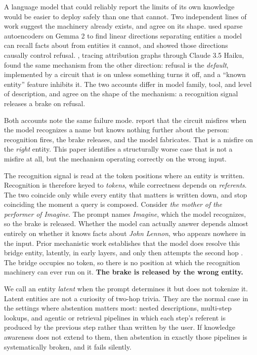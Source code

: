 \documentclass{article}
\begin{document}
A language model that could reliably report the limits of its own knowledge would be easier to deploy safely than one that cannot. Two independent lines of work suggest the machinery
already exists, and agree on its shape. \citet{ferrando2025entity} used sparse autoencoders on Gemma
2 to find linear directions separating entities a model can recall facts about from entities it
cannot, and showed those directions causally control refusal.
\citet{lindsey2025biology}, tracing attribution graphs through Claude 3.5 Haiku, found the same
mechanism from the other direction: refusal is the \emph{default}, implemented by a circuit that is
on unless something turns it off, and a ``known entity'' feature inhibits it. The two accounts differ in model family, tool, and level of description, and agree on
the shape of the mechanism: a recognition signal releases a brake on refusal.

Both accounts note the same failure mode. \citet{lindsey2025biology} report that the circuit misfires
when the model recognizes a name but knows nothing further about the person: recognition fires, the
brake releases, and the model fabricates. That is a misfire on the \emph{right} entity. This paper
identifies a structurally worse case that is not a misfire at all, but the mechanism operating correctly on the wrong input.

The recognition signal is read at the token positions where an entity is written. Recognition is therefore keyed to \emph{tokens}, while correctness depends on
\emph{referents}. The two coincide only while every entity that matters is written down, and stop
coinciding the moment a query is composed. Consider \emph{the mother of the performer of Imagine}. The prompt names
\emph{Imagine}, which the model recognizes, so the brake is released. Whether the model can actually
answer depends almost entirely on whether it knows facts about \emph{John Lennon}, who appears
nowhere in the input. Prior mechanistic work establishes that the model does resolve this bridge
entity, latently, in early layers, and only then attempts the second hop
\citep{yang2024latent,biran2024hopping}. The bridge occupies no token, so there is no position at
which the recognition machinery can ever run on it. \textbf{The brake is released by the wrong
entity.}

We call an entity \emph{latent} when the prompt determines it but does not tokenize it. Latent
entities are not a curiosity of two-hop trivia. They are the normal case in the settings where
abstention matters most: nested descriptions, multi-step lookups, and agentic or retrieval pipelines
in which each step's referent is produced by the previous step rather than written by the user. If
knowledge awareness does not extend to them, then abstention in exactly those pipelines is
systematically broken, and it fails silently.
\end{document}

